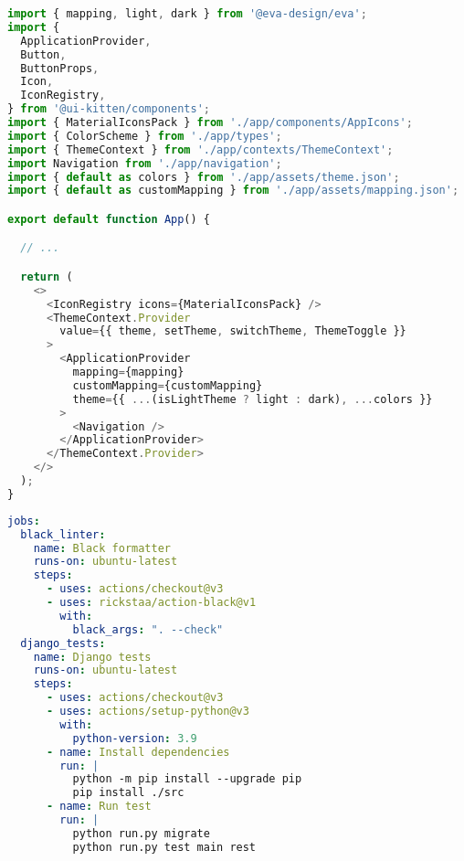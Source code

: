 \documentclass[../main.tex]{subfiles}
\begin{document}
\begin{lstlisting}[language=typescript, caption={Root definition of the \code{App} component, using Eva Design and UI Kitten components in \citecode{SrcAppTsx}}]
import { mapping, light, dark } from '@eva-design/eva';
import {
  ApplicationProvider,
  Button,
  ButtonProps,
  Icon,
  IconRegistry,
} from '@ui-kitten/components';
import { MaterialIconsPack } from './app/components/AppIcons';
import { ColorScheme } from './app/types';
import { ThemeContext } from './app/contexts/ThemeContext';
import Navigation from './app/navigation';
import { default as colors } from './app/assets/theme.json';
import { default as customMapping } from './app/assets/mapping.json';

export default function App() {

  // ...

  return (
    <>
      <IconRegistry icons={MaterialIconsPack} />
      <ThemeContext.Provider
        value={{ theme, setTheme, switchTheme, ThemeToggle }}
      >
        <ApplicationProvider
          mapping={mapping}
          customMapping={customMapping}
          theme={{ ...(isLightTheme ? light : dark), ...colors }}
        >
          <Navigation />
        </ApplicationProvider>
      </ThemeContext.Provider>
    </>
  );
}
\end{lstlisting}

\begin{lstlisting}[language=yaml, caption={job definitions for checking Python code and style in \citecode{serverchecksyml}}]
jobs:
  black_linter:
    name: Black formatter
    runs-on: ubuntu-latest
    steps:
      - uses: actions/checkout@v3
      - uses: rickstaa/action-black@v1
        with:
          black_args: ". --check"
  django_tests:
    name: Django tests
    runs-on: ubuntu-latest
    steps:
      - uses: actions/checkout@v3
      - uses: actions/setup-python@v3
        with:
          python-version: 3.9
      - name: Install dependencies
        run: |
          python -m pip install --upgrade pip
          pip install ./src
      - name: Run test
        run: |
          python run.py migrate
          python run.py test main rest
\end{lstlisting}
\end{document}
